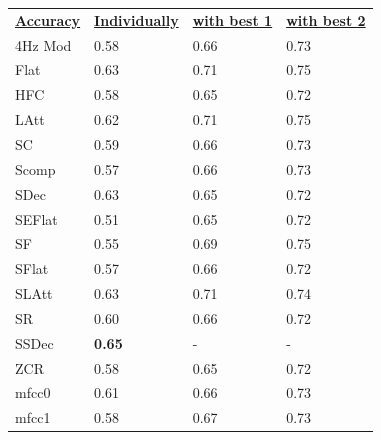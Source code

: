 \begin{table}[h]
\begin{tabular}{llll}
{\ul \textbf{Accuracy}} & {\ul \textbf{Individually}} & {\ul \textbf{with best 1}} & {\ul \textbf{with best 2}} \\
4Hz Mod                 & 0.58                        & 0.66                       & 0.73                       \\
Flat                    & 0.63                        & 0.71                       & 0.75                       \\
HFC                     & 0.58                        & 0.65                       & 0.72                       \\
LAtt                    & 0.62                        & 0.71                       & 0.75                       \\
SC                      & 0.59                        & 0.66                       & 0.73                       \\
Scomp                   & 0.57                        & 0.66                       & 0.73                       \\
SDec                    & 0.63                        & 0.65                       & 0.72                       \\
SEFlat                  & 0.51                        & 0.65                       & 0.72                       \\
SF                      & 0.55                        & 0.69                       & 0.75                       \\
SFlat                   & 0.57                        & 0.66                       & 0.72                       \\
SLAtt                   & 0.63                        & 0.71                       & 0.74                       \\
SR                      & 0.60                        & 0.66                       & 0.72                       \\
SSDec                   & \textbf{0.65}               & -                          & -                          \\
ZCR                     & 0.58                        & 0.65                       & 0.72                       \\
mfcc0                   & 0.61                        & 0.66                       & 0.73                       \\
mfcc1                   & 0.58                        & 0.67                       & 0.73                       \\

\end{tabular}
\end{table}
